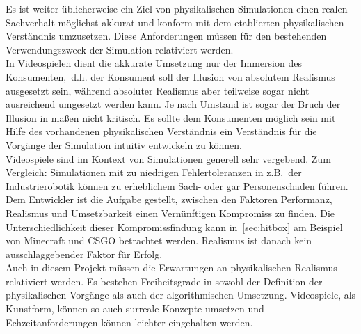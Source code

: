 \label{sec:physical_realism}
Es ist weiter üblicherweise ein Ziel von physikalischen Simulationen einen realen Sachverhalt möglichst akkurat und konform mit dem etablierten physikalischen Verständnis umzusetzen. Diese Anforderungen müssen für den bestehenden Verwendungszweck der Simulation relativiert werden.\\
In Videospielen dient die akkurate Umsetzung nur der Immersion des Konsumenten,~d.h. der Konsument soll der Illusion von absolutem Realismus ausgesetzt sein, während absoluter Realismus aber teilweise sogar nicht ausreichend umgesetzt werden kann. Je nach Umstand ist sogar der Bruch der Illusion in maßen nicht kritisch. Es sollte dem Konsumenten möglich sein mit Hilfe des vorhandenen physikalischen Verständnis ein Verständnis für die Vorgänge der Simulation intuitiv entwickeln zu können.\\
Videospiele sind im Kontext von Simulationen generell sehr vergebend. Zum Vergleich: Simulationen mit zu niedrigen Fehlertoleranzen in z.B.~der Industrierobotik können zu erheblichem Sach- oder gar Personenschaden führen.
Dem Entwickler ist die Aufgabe gestellt, zwischen den Faktoren Performanz, Realismus und Umsetzbarkeit einen Vernünftigen Kompromiss zu finden. Die Unterschiedlichkeit dieser Kompromissfindung kann in~\ref{sec:hitbox} am Beispiel von Minecraft und CSGO betrachtet werden. Realismus ist danach kein ausschlaggebender Faktor für Erfolg.\\

Auch in diesem Projekt müssen die Erwartungen an physikalischen Realismus relativiert werden. Es bestehen Freiheitsgrade in sowohl der Definition der physikalischen Vorgänge als auch der algorithmischen Umsetzung. 
Videospiele, als Kunstform, können so auch surreale Konzepte umsetzen und Echzeitanforderungen können leichter eingehalten werden.

